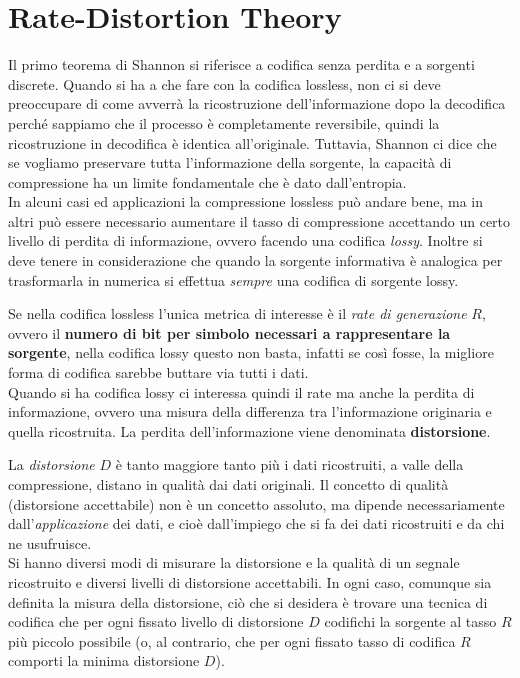\section{Rate-Distortion Theory} \label{sec:rdt}
Il primo teorema di Shannon si riferisce a codifica senza perdita e a sorgenti discrete. Quando si ha a che fare
con la codifica lossless, non ci si deve preoccupare di come avverrà la ricostruzione dell’informazione dopo
la decodifica perché sappiamo che il processo è completamente reversibile, quindi la ricostruzione in
decodifica è identica all’originale. Tuttavia, Shannon ci dice che se vogliamo preservare tutta l’informazione
della sorgente, la capacità di compressione ha un limite fondamentale che è dato dall’entropia. \\
In alcuni casi ed applicazioni la compressione lossless può andare bene, ma in altri può essere necessario aumentare il tasso di compressione accettando un certo livello di perdita di informazione, ovvero facendo una codifica \textit{lossy}. Inoltre si deve tenere in considerazione che quando la sorgente informativa è analogica per
trasformarla in numerica si effettua \textit{sempre} una codifica di sorgente lossy.

Se nella codifica lossless l’unica metrica di interesse è il \textit{rate di generazione} $R$, ovvero il \textbf{numero di bit per simbolo necessari a rappresentare la sorgente}, nella codifica lossy questo non basta, infatti se così fosse, la migliore forma di codifica sarebbe buttare via tutti i dati. \\
Quando si ha codifica lossy ci interessa quindi il rate ma anche la perdita di informazione, ovvero una misura della differenza tra l’informazione originaria e quella ricostruita. La perdita dell’informazione viene denominata \textbf{distorsione}.

La \textit{distorsione} $D$ è tanto maggiore tanto pi\`u i dati ricostruiti, a valle della compressione, distano in qualità dai dati originali. Il concetto di qualità (distorsione accettabile) non è un concetto assoluto, ma dipende necessariamente dall’\textit{applicazione} dei dati, e cioè dall’impiego che si fa dei dati ricostruiti e da chi ne usufruisce. \\
Si hanno diversi modi di misurare la distorsione e la qualità di un segnale ricostruito e diversi livelli di distorsione accettabili. In ogni caso, comunque sia definita la misura della distorsione, ci\`o che si desidera è trovare una tecnica di codifica che per ogni fissato livello di distorsione $D$ codifichi la sorgente al tasso $R$ più piccolo possibile (o, al contrario, che per ogni fissato tasso di codifica $R$ comporti la minima distorsione $D$).

